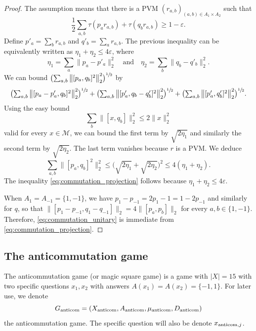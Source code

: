 \documentclass[JEP,XML,SOM,Unicode,published]{cedram}
\let\ts\textstyle
\theoremstyle{plain}
\theoremstyle{definition}
\newcommand{\cM}{\mathcal{M}}
\newcommand{\anticom}{\textup{anticom}}
\begin{document}
\begin{proof}
The assumption means that there is a PVM $(r_{a,b})_{(a,b)\in A_1 \times A_2}$ such that
\[
\frac 1 2 \sum_{a,b} \tau( p_a r_{a,b}) + \tau(q_b r_{a,b}) \geq 1-\varepsilon.
\]
Define $p'_a= \sum_b r_{a,b}$ and $q'_b = \sum_a r_{a,b}$. The previous inequality can be equivalently written as $\eta_1+\eta_2 \leq 4\varepsilon$, where
\[
\eta_1 = \sum_a \|p_a - p'_a\|_2^2
\quad
\text{and}
\quad
\eta_2 = \sum_b \|q_b - q'_b\|_2^2.
\]
We can bound $\bigl(\sum_{a,b} \big\|[p_a,q_b]^2\big\|_2^2\bigr)^{\sfrac 1 2}$ by
\[\ts
\bigl(\sum_{a,b} \big\|[p_a-p'_a,q_b]^2\big\|_2^2\bigr)^{\sfrac 1 2} + \bigl(\sum_{a,b} \big\|[p'_a,q_b-q'_b]^2\big\|_2^2\bigr)^{\sfrac 1 2} + \bigl(\sum_{a,b} \big\|[p'_a,q'_b]^2\big\|_2^2\bigr)^{\sfrac 1 2}.
\]
Using the easy bound
\[
\sum_b \big\|[x,q_b]\big\|_2^2 \leq 2 \|x\|_2^2
\]
valid for every $x \in \cM$, we can bound the first term by $\sqrt{2 \eta_1}$ and similarly the second term by $\sqrt{2 \eta_2}$. The last term vanishes because $r$ is a PVM. We deduce
\[
\sum_{a,b} \|[p_a,q_b]^2\|_2^2 \leq \bigl(\sqrt{2\eta_1}+\sqrt{2\eta_2}\bigr)^2 \leq 4(\eta_1+\eta_2).
\]
The inequality \eqref{eq:commutation_projection} follows because $\eta_1+\eta_2 \leq 4\varepsilon$.

When $A_1=A_{-1}=\{1,-1\}$, we have $p_1 - p_{-1} = 2p_1-1 =1-2p_{-1}$ and similarly for $q$, so that $\big\|[p_1-p_{-1},q_1-q_{-1}]\big\|_2 = 4\big\|[p_a,p_b]\big\|_2$ for every $a,b \in \{1,-1\}$. Therefore, \eqref{eq:commutation_unitary} is immediate from \eqref{eq:commutation_projection}.
\end{proof}

\subsection{The anticommutation game}
The anticommutation game (or magic square game) is a game with $|X|=15$ with two specific questions $x_1,x_2$ with answers $A(x_1) = A(x_2)=\{-1,1\}$. For later use, we denote \[
G_{\anticom}= (X_{\anticom},A_{\anticom},\mu_{\anticom},D_{\anticom})
\] the anticommutation game. The specific question will also be denote $x_{\anticom,j}$.
\end{document}
